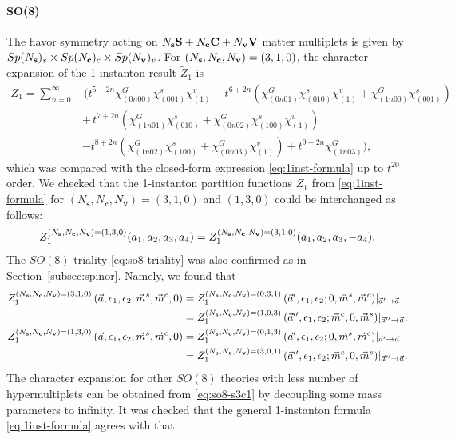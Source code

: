 \documentclass[letterpaper, 11pt]{article}
\newcommand{\nn}{\nonumber}
\begin{document}
{\paragraph{SO(8)} The flavor symmetry acting on $N_{\bf s} \mathbf{S} + N_{\bf c} \mathbf{C} + N_{\bf v} \mathbf{V}$ matter multiplets is given by $Sp(N_{\bf s})_s \times Sp(N_{\bf c})_c \times Sp(N_{\bf v})_v$. For $(N_{\bf s}, N_{\bf c}, N_{\bf v}) = (3,1,0)$, the character expansion of the 1-instanton result $\tilde{Z}_1$ is 
\begin{align}
  \label{eq:so8-s3c1}
\tilde{Z}_1=\sum_{n=0}^{\infty}&\,\Big(t^{5+2n}\chi^G_{(0n00)}\chi^s_{(001)}\chi^v_{(1)}-t^{6+2n}(\chi^G_{(0n01)}\chi^s_{(010)}\chi^v_{(1)}+\chi^G_{(1n00)}\chi^s_{(001)})\nn\\
&+\,t^{7+2n}(\chi^G_{(1n01)}\chi^s_{(010)}+\chi^G_{(0n02)}\chi^s_{(100)}\chi^v_{(1)})\\
&-t^{8+2n}(\chi^G_{(1n02)}\chi^s_{(100)}+\chi^G_{(0n03)}\chi^v_{(1)})+t^{9+2n}\chi^G_{(1n03)}\Big),\nn
\end{align}
which was compared with the closed-form expression \eqref{eq:1inst-formula} up to $t^{20}$ order.
We checked that the 1-instanton partition functions ${Z}_1$ from \eqref{eq:1inst-formula} for $(N_\mathbf{s},N_\mathbf{c}, N_{\mathbf{v}})= (3,1,0)$ and $(1,3,0)$ could be interchanged as follows: 
\begin{align}
  Z_{1}^{(N_{\bf s}, N_{\bf c}, N_{\bf v}) = (1,3,0)}(a_1,a_2,a_3,a_4) = Z_{1}^{(N_{\bf s}, N_{\bf c}, N_{\bf v}) = (3,1,0)}(a_1,a_2,a_3,-a_4).
\end{align}
The $SO(8)$ triality \eqref{eq:so8-triality} was also confirmed as in Section~\ref{subsec:spinor}. Namely, we found that 
\begin{align}
  \begin{split}
  Z_1^{(N_{\bf s}, N_{\bf c}, N_{\bf v}) = (3,1,0)}\,(\vec{a}, \epsilon_1,\epsilon_2;\vec{m}^s,\vec{m}^c,0)  &= Z_1^{(N_{\bf s}, N_{\bf c}, N_{\bf v}) = (0,3,1)}\,(\vec{a}', \epsilon_1,\epsilon_2;0,\vec{m}^s,\vec{m}^c)|_{\vec{a}' \rightarrow \vec{a}}\\
  &= Z_1^{(N_{\bf s}, N_{\bf c}, N_{\bf v}) = (1,0,3)}\,(\vec{a}'', \epsilon_1,\epsilon_2;\vec{m}^c,0,\vec{m}^s)|_{\vec{a}'' \rightarrow \vec{a}},
  \end{split}\\
  \begin{split}
    Z_1^{(N_{\bf s}, N_{\bf c}, N_{\bf v}) = (1,3,0)}\,(\vec{a}, \epsilon_1,\epsilon_2;\vec{m}^s,\vec{m}^c,0)  &= Z_1^{(N_{\bf s}, N_{\bf c}, N_{\bf v}) = (0,1,3)}\,(\vec{a}', \epsilon_1,\epsilon_2;0,\vec{m}^s,\vec{m}^c)|_{\vec{a}' \rightarrow \vec{a}}\\
    &= Z_1^{(N_{\bf s}, N_{\bf c}, N_{\bf v}) = (3,0,1)}\,(\vec{a}'', \epsilon_1,\epsilon_2;\vec{m}^c,0,\vec{m}^s)|_{\vec{a}'' \rightarrow \vec{a}}.
    \end{split}
\end{align}
The character expansion for other $SO(8)$ theories with less number of hypermultiplets can be obtained from \eqref{eq:so8-s3c1} by decoupling some mass parameters to infinity. It was checked that the general 1-instanton formula \eqref{eq:1inst-formula} agrees with that.



}
\end{document}
